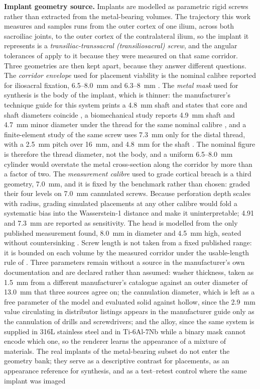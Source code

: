 \documentclass[9pt]{extarticle}
\begin{document}
\textbf{Implant geometry source.} Implants are modelled as parametric rigid screws rather than extracted from the metal-bearing volumes. The trajectory this work measures and samples runs from the outer cortex of one ilium, across both sacroiliac joints, to the outer cortex of the contralateral ilium, so the implant it represents is a \emph{transiliac-transsacral (transiliosacral) screw}, and the angular tolerances of \citet{mclaren2021corridor} apply to it because they were measured on that same corridor. Three geometries are then kept apart, because they answer different questions. The \emph{corridor envelope} used for placement viability is the nominal calibre reported for iliosacral fixation, 6.5--8.0~mm \citep{gardner2010safezones} and 6.3--8~mm \citep{kaiser2014dysmorphism}. The \emph{metal mask} used for synthesis is the body of the implant, which is thinner: the manufacturer's technique guide for this system prints a 4.8~mm shaft and states that core and shaft diameters coincide \citep{synthes2003guide}, a biomechanical study reports 4.9~mm shaft and 4.7~mm minor diameter under the thread for the same nominal calibre \citep{gardner2015screw}, and a finite-element study of the same screw uses 7.3~mm only for the distal thread, with a 2.5~mm pitch over 16~mm, and 4.8~mm for the shaft \citep{zhu2022optimalposition}. The nominal figure is therefore the thread diameter, not the body, and a uniform 6.5--8.0~mm cylinder would overstate the metal cross-section along the corridor by more than a factor of two. The \emph{measurement calibre} used to grade cortical breach is a third geometry, 7.0~mm, and it is fixed by the benchmark rather than chosen: \citet{zwingmann2009navigated} graded their four levels on 7.0~mm cannulated screws. Because perforation depth scales with radius, grading simulated placements at any other calibre would fold a systematic bias into the Wasserstein-1 distance and make it uninterpretable; 4.91 and 7.3~mm are reported as sensitivity. The head is modelled from the only published measurement found, 8.0~mm in diameter and 4.5~mm high, seated without countersinking \citep{sayres2014comparison}. Screw length is not taken from a fixed published range: it is bounded on each volume by the measured corridor under the usable-length rule of \citet{kaiser2014dysmorphism}. Three parameters remain without a source in the manufacturer's own documentation and are declared rather than assumed: washer thickness, taken as 1.5~mm from a different manufacturer's catalogue \citep{doublemedical2021trauma} against an outer diameter of 13.0~mm that three sources agree on; the cannulation diameter, which is left as a free parameter of the model and evaluated solid against hollow, since the 2.9~mm value circulating in distributor listings appears in the manufacturer guide only as the cannulation of drills and screwdrivers; and the alloy, since the same system is supplied in 316L stainless steel and in Ti-6Al-7Nb \citep{synthes2003guide} while a binary mask cannot encode which one, so the renderer learns the appearance of a mixture of materials. The real implants of the metal-bearing subset do not enter the geometry bank; they serve as a descriptive contrast for placements, as an appearance reference for synthesis, and as a test--retest control where the same implant was imaged 
\end{document}
